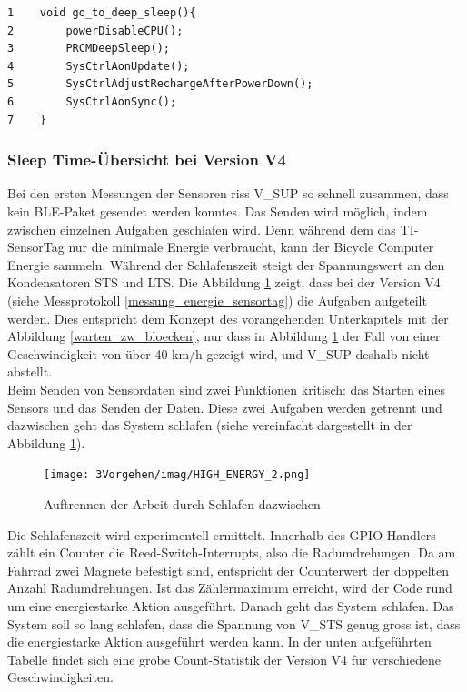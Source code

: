\begin{minipage}[t]{1\textwidth}
\small\begin{verbatim}
1    void go_to_deep_sleep(){ 
2        powerDisableCPU();
3        PRCMDeepSleep();
4        SysCtrlAonUpdate();
5        SysCtrlAdjustRechargeAfterPowerDown();
6        SysCtrlAonSync();
7    }
\end{verbatim}\normalsize
\end{minipage}

\subsubsection{Sleep Time-Übersicht bei Version V4}
	    
Bei den ersten Messungen der Sensoren riss V\_SUP so schnell zusammen, dass kein BLE-Paket gesendet werden konntes. Das Senden wird möglich, indem zwischen einzelnen Aufgaben geschlafen wird. Denn während dem das TI-SensorTag nur die minimale Energie verbraucht, kann der Bicycle Computer Energie sammeln. Während der Schlafenszeit steigt der Spannungswert an den Kondensatoren STS und LTS. Die Abbildung \ref{schnarch} zeigt, dass bei der Version V4 (siehe Messprotokoll \ref{messung_energie_sensortag}) die Aufgaben aufgeteilt werden. Dies entspricht dem Konzept des vorangehenden Unterkapitels mit der Abbildung \ref{warten_zw_bloecken}, nur dass in Abbildung \ref{schnarch} der Fall von einer Geschwindigkeit von über 40 km/h gezeigt wird, und V\_SUP deshalb nicht abstellt.\\   

Beim Senden von Sensordaten sind zwei Funktionen kritisch: das Starten eines Sensors und das Senden der Daten. Diese zwei Aufgaben werden getrennt und dazwischen geht das System schlafen (siehe vereinfacht dargestellt in der Abbildung \ref{schnarch}).\\

\begin{figure}[ht]
  \texttt{[image: 3Vorgehen/imag/HIGH\_ENERGY\_2.png]}
  \caption{Auftrennen der Arbeit durch Schlafen dazwischen}
  \label{schnarch}
\end{figure}

Die Schlafenszeit wird experimentell ermittelt. Innerhalb des GPIO-Handlers zählt ein Counter die Reed-Switch-Interrupts, also die Radumdrehungen. Da am Fahrrad zwei Magnete befestigt sind, entspricht der Counterwert der doppelten Anzahl Radumdrehungen. Ist  das Zählermaximum erreicht, wird der Code rund um eine energiestarke Aktion ausgeführt. Danach geht das System schlafen. Das System soll so lang schlafen, dass die Spannung von V\_STS genug gross ist, dass die energiestarke Aktion ausgeführt werden kann. In der unten aufgeführten Tabelle findet sich eine grobe Count-Statistik der Version V4 für verschiedene Geschwindigkeiten. 

